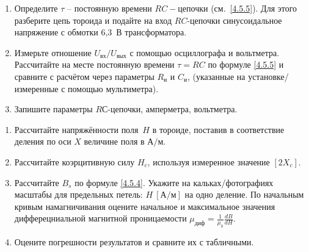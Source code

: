 \begin{lab:task}
\begin{enumerate}
\item
Определите $\tau$ -- постоянную времени $RC-$цепочки (см.~\eqref{4.5.5}). Для
этого разберите цепь тороида и подайте на вход $RC$-цепочки синусоидальное напряжение
с обмотки 6,3~В трансформатора.

\item
Измерьте отношение $U_\text{вх} / U_\text{вых}$ с помощью осциллографа и
вольтметра. Рассчитайте на месте постоянную времени $\tau=RC$ по формуле
\eqref{4.5.5} и сравните с расчётом через параметры $R_\text{и}$ и $C_\text{и}$,
(указанные на установке/измеренные с помощью мультиметра).

\item
Запишите параметры $RС$-цепочки, амперметра, вольтметра.
\end{enumerate}

\begin{enumerate}

\item
Рассчитайте напряжённости поля~$H$ в тороиде, поставив в соответствие деления по
оси $X$ величине поля в $\text{А} / \text{м}$.

\item
Рассчитайте коэрцитивную силу $H_c$, используя измеренное значение $[2X_c]$.

\item
Рассчитайте $B_s$ по формуле \eqref{4.5.4}. Укажите на
кальках/фотографиях масштабы для предельных петель: $H~[\text{А} / \text{м}]$ на одно
деление. По начальным кривым намагничивания
оцените начальное и максимальное значения дифферецниальной
магнитной проницаемости $\mu_\text{диф}=\frac{1}{\mu_0}\frac{dB}{dH}$.

\item
Оцените погрешности результатов и сравните их с табличными.

\end{enumerate}
\end{lab:task}

